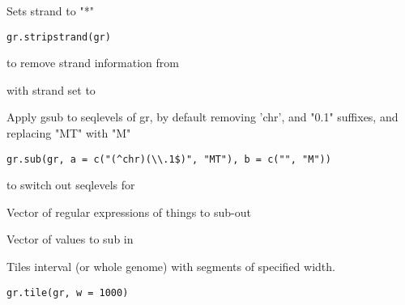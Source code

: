 \documentclass[a4paper]{book}
\begin{document}
%
\begin{Description}\relax
Sets strand to "*"
\end{Description}
%
\begin{Usage}
\begin{verbatim}
gr.stripstrand(gr)
\end{verbatim}
\end{Usage}
%
\begin{Arguments}
\begin{ldescription}
\item[\code{gr}]  to remove strand information from
\end{ldescription}
\end{Arguments}
%
\begin{Value}
 with strand set to \code{*}
\end{Value}
%
\begin{Description}\relax
Apply gsub to seqlevels of gr, by default removing 'chr', and "0.1" suffixes, and replacing "MT" with "M"
\end{Description}
%
\begin{Usage}
\begin{verbatim}
gr.sub(gr, a = c("(^chr)(\\.1$)", "MT"), b = c("", "M"))
\end{verbatim}
\end{Usage}
%
\begin{Arguments}
\begin{ldescription}
\item[\code{gr}]  to switch out seqlevels for

\item[\code{a}] Vector of regular expressions of things to sub-out

\item[\code{b}] Vector of values to sub in
\end{ldescription}
\end{Arguments}
%
\begin{Description}\relax
Tiles interval (or whole genome) with segments of \code{<=} specified width.
\end{Description}
%
\begin{Usage}
\begin{verbatim}
gr.tile(gr, w = 1000)
\end{verbatim}
\end{Usage}
\end{document}

